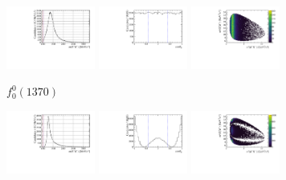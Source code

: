 \begin{figure}[!h]
    \centering
    \begin{subfigure}[t]{1.0\textwidth}
        \includegraphics[width=0.32\textwidth]{figs/B2DsPhi/f0_1370_phi_mass.pdf}
        \includegraphics[width=0.32\textwidth]{figs/B2DsPhi/f0_1370_Helicity.pdf}
        \includegraphics[width=0.32\textwidth]{figs/B2DsPhi/f0_1370_Dalitz_plot.pdf}
        \caption{$f_{0}^{0}(1370)$}
    \end{subfigure}
    \begin{subfigure}[t]{1.0\textwidth}
        \includegraphics[width=0.32\textwidth]{figs/B2DsPhi/f2_phi_mass.pdf}
        \includegraphics[width=0.32\textwidth]{figs/B2DsPhi/f2_Helicity.pdf}
        \includegraphics[width=0.32\textwidth]{figs/B2DsPhi/f2_Dalitz_plot.pdf}

\end{subfigure}
\end{figure}
